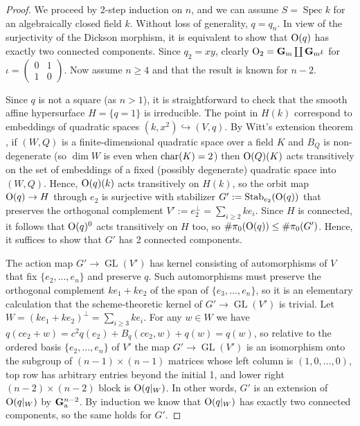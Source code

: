 \documentclass[10pt]{article}
\newcommand{\GL}{\operatorname{GL}}
\renewcommand{\(}{\left(}
\renewcommand{\)}{\right)}
\newcommand{\Spec}{\operatorname{Spec}}
\numberwithin{thm}{subsection}
\begin{document}
\begin{proof}
We proceed by 2-step induction on $n$, and we
can assume $S = \Spec k$ for an algebraically closed field $k$.
Without loss of generality, $q = q_n$.  In view of the surjectivity
of the Dickson morphism, it is equivalent to show that ${\rm{O}}(q)$
has exactly two connected components.  Since $q_2 = xy$, clearly
${\rm{O}}_2 = {\mathbf{G}}_{\rm{m}} \coprod {\mathbf{G}}_{\rm{m}} \iota$ for
$\iota = (\begin{smallmatrix} 0 & 1 \\ 1 & 0 \end{smallmatrix})$.
Now assume $n \ge 4$ and that the result is known for $n - 2$.

Since $q$ is not a square (as $n > 1$),
it is straightforward to check that the smooth affine hypersurface $H = \{q = 1\}$ is irreducible.
The point in $H(k)$ correspond to embeddings of quadratic spaces
$(k, x^2) \hookrightarrow (V,q)$.  By Witt's extension theorem
\cite[I.4.1]{chevquad}, if $(W,Q)$ is a finite-dimensional
quadratic space over a field $K$ and $B_Q$ is non-degenerate
(so $\dim W$ is even when ${\rm{char}}(K) = 2$) then 
${\rm{O}}(Q)(K)$ acts transitively on the set of embeddings of a fixed
(possibly degenerate) quadratic space into $(W,Q)$.
Hence, ${\rm{O}}(q)(k)$ acts transitively on $H(k)$, so 
the orbit map ${\rm{O}}(q) \rightarrow H$ through
$e_2$ is surjective with stabilizer
$G' := {\rm{Stab}}_{e_2}({\rm{O}}(q))$
that preserves the orthogonal complement
$V' := e_2^{\perp} = \sum_{i \ge 2} k e_i$.  
Since $H$ is connected, it follows that
${\rm{O}}(q)^0$ acts transitively on $H$ too, 
so $\#\pi_0({\rm{O}}(q)) \le \#\pi_0(G')$.   Hence,
it suffices to show that $G'$ has 2 connected components.

The action map $G' \rightarrow \GL(V')$ has kernel consisting
of automorphisms of $V$ that fix $\{e_2,\dots,e_n\}$ 
and preserve $q$.  Such automorphisms must preserve
the orthogonal complement $k e_1 + k e_2$ of the span of $\{e_3,\dots,e_n\}$,
so it is an elementary calculation that the scheme-theoretic
kernel of $G' \rightarrow \GL(V')$ is trivial.  
Let $W = (ke_1 + k e_2)^{\perp} = \sum_{i \ge 3} k e_i$. For any $w \in W$
we have $q(ce_2 + w) = c^2 q(e_2) + B_q(ce_2,w) + q(w) = q(w)$, so
relative to the ordered basis $\{e_2,\dots,e_n\}$ of $V'$
the map $G' \rightarrow \GL(V')$ is an isomorphism onto the subgroup of $(n-1) \times (n-1)$ matrices
whose left column is $(1,0,\dots,0)$, top row has arbitrary entries beyond the initial 1,
and lower right $(n-2) \times (n-2)$ block is ${\rm{O}}(q|_W)$.
In other words, $G'$ is an extension of ${\rm{O}}(q|_W)$ by ${\mathbf{G}}_{\rm{a}}^{n-2}$.
By induction we know that ${\rm{O}}(q|_W)$ has exactly two connected components,
so the same holds for $G'$.  
\end{proof}
\end{document}
